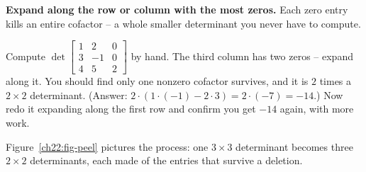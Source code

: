 \begin{focusbox}
\textbf{Expand along the row or column with the most zeros.} Each zero entry kills an entire cofactor
-- a whole smaller determinant you never have to compute.
\end{focusbox}

\begin{labbox}
Compute $\det\!\begin{bmatrix} 1 & 2 & 0 \\ 3 & -1 & 0 \\ 4 & 5 & 2 \end{bmatrix}$ by hand. The third
column has two zeros -- expand along it. You should find only one nonzero cofactor survives, and it is
$2$ times a $2\times2$ determinant. (Answer: $2\cdot(1\cdot(-1)-2\cdot3)=2\cdot(-7)=-14$.) Now redo
it expanding along the first row and confirm you get $-14$ again, with more work.
\end{labbox}

Figure~\ref{ch22:fig-peel} pictures the process: one $3\times3$ determinant becomes three $2\times2$
determinants, each made of the entries that survive a deletion.

